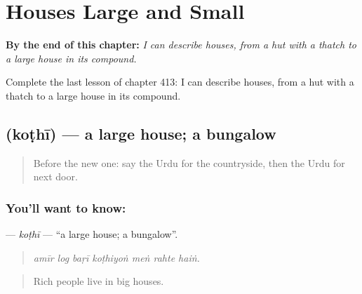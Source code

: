 
\chapter{Houses Large and Small}
\label{ch:ur-houses-large-and-small}

\begin{chapteropening}
\textbf{By the end of this chapter:} \emph{I can describe houses, from a hut with a thatch to a large house in its compound.}

Complete the last lesson of chapter 413: I can describe houses, from a hut with a thatch to a large house in its compound.
\end{chapteropening}

\section[\texorpdfstring{\ur{کوٹھی} (koṭhī)}{کوٹھی (koṭhī)}]{ (koṭhī) — a large house; a bungalow}

\label{lesson:UR-C413-kothi}



\begin{quote}
Before the new one: say the Urdu for the countryside, then the Urdu for next door.
\end{quote}

\subsection*{You'll want to know: }
\textbf{} — \emph{koṭhī} — \textquotedblleft{}a large house; a bungalow\textquotedblright{}.

\begin{quote}
      
\end{quote}

\begin{quote}
\emph{amīr log baṛī koṭhiyoṅ meṅ rahte haiṅ.}
\end{quote}

\begin{quote}
Rich people live in big houses.
\end{quote}

